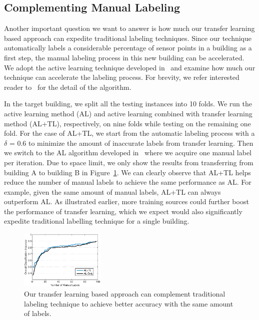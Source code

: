\subsection{Complementing Manual Labeling}
Another important question we want to answer is how much our transfer learning based approach can expedite traditional labeling techniques.
Since our technique automatically labels a considerable percentage of sensor points in a building as a first step, the manual labeling process in this new building can be accelerated.
We adopt the active learning technique developed in~\cite{cikm} and examine how much our technique can accelerate the labeling process.
For brevity, we refer interested reader to~\cite{cikm} for the detail of the algorithm.

In the target building, we split all the testing instances into 10 folds. We run the active learning method (AL) and active learning combined with transfer learning method (AL+TL), respectively, on nine folds while testing on the remaining one fold.
For the case of AL+TL, we start from the automatic labeling process with a $\delta$ = 0.6 to minimize the amount of inaccurate labels from transfer learning. Then we switch to the AL algorithm developed in~\cite{cikm} where we acquire one manual label per iteration. Due to space limit, we only show the results from  transferring from building A to building B in Figure~\ref{fig:comp}.
We can clearly observe that AL+TL helps reduce the number of manual labels to achieve the same performance as AL.
For example, given the same amount of manual labels, AL+TL can always outperform AL. As illustrated earlier, more training sources could further boost the performance of transfer learning, which we expect would also significantly expedite traditional labelling technique for a single building.

\begin{figure}[t]
\centering
\includegraphics[width=0.36\textwidth]{./fig/tl_al.eps}
\caption{Our transfer learning based approach can complement traditional labeling technique to achieve better accuracy with the same amount of labels.}
\label{fig:comp}
\end{figure}


